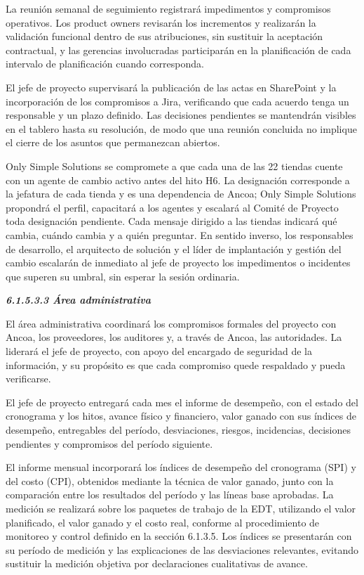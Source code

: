 \documentclass[11pt]{article}
\begin{document}
La reunión semanal de seguimiento registrará impedimentos y compromisos
operativos. Los product owners revisarán los incrementos y realizarán la
validación funcional dentro de sus atribuciones, sin sustituir la
aceptación contractual, y las gerencias involucradas participarán en la
planificación de cada intervalo de planificación cuando corresponda.

El jefe de proyecto supervisará la publicación de las actas en
SharePoint y la incorporación de los compromisos a Jira, verificando que
cada acuerdo tenga un responsable y un plazo definido. Las decisiones
pendientes se mantendrán visibles en el tablero hasta su resolución, de
modo que una reunión concluida no implique el cierre de los asuntos que
permanezcan abiertos.

Only Simple Solutions se compromete a que cada una de las 22 tiendas cuente con un agente de cambio activo antes del hito H6. La designación corresponde a la jefatura de cada tienda y es una dependencia de Ancoa; Only Simple Solutions propondrá el perfil, capacitará a los agentes y escalará al Comité de Proyecto toda designación pendiente.
Cada mensaje dirigido a las tiendas indicará qué cambia, cuándo cambia y
a quién preguntar. En sentido inverso, los responsables de desarrollo,
el arquitecto de solución y el líder de implantación y gestión del
cambio escalarán de inmediato al jefe de proyecto los impedimentos o
incidentes que superen su umbral, sin esperar la sesión ordinaria.

\emph{\textbf{6.1.5.3.3 Área administrativa}}

El área administrativa coordinará los compromisos formales del proyecto
con Ancoa, los proveedores, los auditores y, a través de Ancoa, las
autoridades. La liderará el jefe de proyecto, con apoyo del encargado de
seguridad de la información, y su propósito es que cada compromiso quede
respaldado y pueda verificarse.

El jefe de proyecto entregará cada mes el informe de desempeño, con el
estado del cronograma y los hitos, avance físico y financiero, valor
ganado con sus índices de desempeño, entregables del período,
desviaciones, riesgos, incidencias, decisiones pendientes y compromisos
del período siguiente.

El informe mensual incorporará los índices de desempeño del cronograma
(SPI) y del costo (CPI), obtenidos mediante la técnica de valor ganado,
junto con la comparación entre los resultados del período y las líneas
base aprobadas. La medición se realizará sobre los paquetes de trabajo
de la EDT, utilizando el valor planificado, el valor ganado y el costo
real, conforme al procedimiento de monitoreo y control definido en la
sección 6.1.3.5. Los índices se presentarán con su período de medición y
las explicaciones de las desviaciones relevantes, evitando sustituir la
medición objetiva por declaraciones cualitativas de avance.
\end{document}
